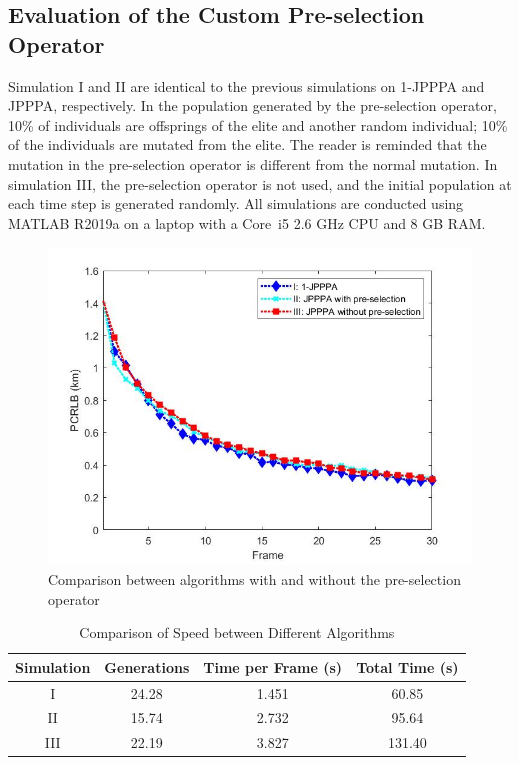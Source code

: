 \documentclass[12pt,journal,draftclsnofoot,onecolumn]{IEEEtran}
\begin{document}
\subsection{Evaluation of the Custom Pre-selection Operator}
Simulation I and II %
are identical to the previous simulations on 1-JPPPA and JPPPA, respectively. In the population generated by the pre-selection operator, 10\% of individuals are offsprings of the elite and another random individual; 10\% of the individuals are mutated from the elite. The reader is reminded that the mutation in the pre-selection operator is different from the normal mutation. In simulation III, the pre-selection operator is not used, and the initial population at each time step is generated randomly. All simulations are conducted using MATLAB R2019a on a laptop with a Core\texttrademark\ i5 2.6 GHz CPU and 8 GB RAM.

\begin{figure}
	\centering
	\includegraphics[scale=0.36]{Pre Selection.jpg}
	\caption{Comparison between algorithms with and without the pre-selection operator}
	\label{fig:Pre-selection}
\end{figure}


 \begin{table}
	\centering
	\caption{Comparison of Speed between Different Algorithms}
	\begin{tabular}{cccc}
		\toprule
		Simulation & Generations & Time per Frame (s) & Total Time (s)\\ 
		\midrule
		I & 24.28 & 1.451 & 60.85\\ 
		II & 15.74 & 2.732 & 95.64\\ 
		III & 22.19 & 3.827 & 131.40\\ 
		\bottomrule
	\end{tabular}
	\label{tab:Pre-selection}
\end{table}
\end{document}
